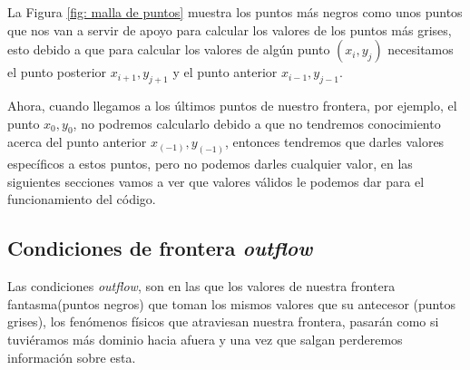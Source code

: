 \documentclass[12pt,a4paper]{book}
\begin{document}
La Figura \ref{fig: malla de puntos} muestra 
los puntos más negros como unos puntos que nos van a 
servir de apoyo para calcular los valores de los puntos más grises, esto debido a que para calcular 
los valores de algún punto $(x_i, y_j)$ necesitamos el punto posterior $x_{i+1}, y_{j+1}$ y el punto 
anterior $x_{i-1}, y_{j-1}$.

Ahora, cuando llegamos a los últimos puntos de nuestro frontera, 
por ejemplo, el punto $x_{0}, y_{0}$, no podremos calcularlo debido a que  no tendremos conocimiento acerca del punto anterior $x_{(-1)}, y_{(-1)}$, entonces  tendremos que darles valores específicos a estos puntos, pero no podemos darles cualquier valor, en las siguientes secciones vamos a ver que valores válidos le podemos dar para el funcionamiento del código. 

\subsection{Condiciones de frontera \emph{outflow}}

Las condiciones \emph{outflow}, son en las que los valores de nuestra frontera fantasma(puntos negros) que toman los  mismos valores que su antecesor (puntos grises), los fenómenos físicos que atraviesan nuestra frontera, pasarán como si tuviéramos más dominio hacia afuera y una vez que salgan perderemos información sobre esta.
\end{document}
